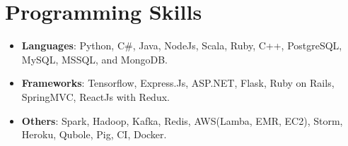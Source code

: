 \documentclass[letterpaper,11pt]{article}
\newcommand{\resumeSubHeadingListStart}{\begin{itemize}[leftmargin=*]}
\newcommand{\resumeSubHeadingListEnd}{\end{itemize}\vspace{-14pt}}
\begin{document}
\section{Programming Skills}
 \resumeSubHeadingListStart
    \setlength\itemsep{0em}
    \item{
     \textbf{Languages}{: Python, C\#, Java, NodeJs, Scala, Ruby, C++, PostgreSQL, MySQL, MSSQL, and MongoDB.}
    }
    \item{
     \textbf{Frameworks}{: Tensorflow, Express.Js, ASP.NET, Flask, Ruby on Rails, SpringMVC, ReactJs with Redux.}
    }
    \item{
     \textbf{Others}{: Spark, Hadoop, Kafka, Redis, AWS(Lamba, EMR, EC2), Storm, Heroku, Qubole, Pig, CI, Docker.}
    }
 \resumeSubHeadingListEnd
 
\end{document}
